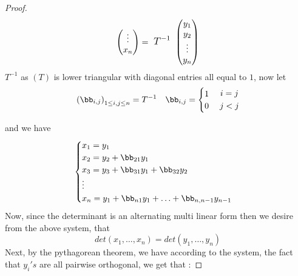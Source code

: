 \begin{proof}
\[\begin{pmatrix}
	\vdots   \\ 
	 x_{n}\\
\end{pmatrix}
= 
\text{ \large $T^{-1}$ \normalfont} 
\begin{pmatrix}
       y_1 \\
	 y_{2}\\
	\vdots  \\
	y_{n} \\
\end{pmatrix}
\]
$T^{-1} $ as $(T)  $ is lower triangular with diagonal 
entries all equal to $1$, now let 
\[
	\left( \bb _{i,j} \right)_{1 \leq i,j \leq n} = 
	T^{-1} \quad 
	\bb _{i,j} = 
	\begin{cases}
	1  \\
	0
	\end{cases}
	\begin{gathered}  
	 i = j\\ 
	 j < j
	\end{gathered}
\]

and we have 
\[
\begin{cases}
x_1 = y_1 \\
x_2 = y_2 + \bb_{21}y_1 \\
x_3 = y_3 + \bb_{31} y_1 + \bb _{32} y_2 \\
\vdots \\
x_{n} = y_1 + \bb _{n1}y_1 + \hdots + \bb _{n, n-1} y_{n-1} \\
\end{cases}
\]
Now, since the determinant is an alternating multi linear form
then we desire from the above system, that 
\[
det(x_1, \hdots , x_n )  = 
det (y_1, \hdots , y_n )  
\]
Next, by the pythagorean theorem, we have
according to the system, the fact that $y_{i}'s$ are all pairwise orthogonal,
we get that : 


\end{proof}
